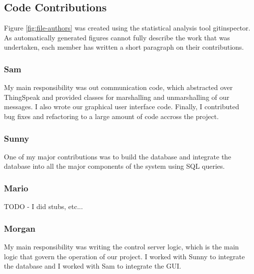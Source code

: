
\subsection{Code Contributions}

Figure \ref{fig:file-authors} was created using the statistical analysis tool
gitinspector. As automatically generated figures cannot fully describe the work
that was undertaken, each member has written a short paragraph on their
contributions.

\subsubsection{Sam}
My main responsibility was out communication code, which abstracted over
ThingSpeak and provided classes for marshalling and unmarshalling of our
messages. I also wrote our graphical user interface code. Finally, I
contributed bug fixes and refactoring to a large amount of code accross the
project.

\subsubsection{Sunny}
One of my major contributions was to build the
database and integrate the database into all
the major components of the system using SQL queries.
\subsubsection{Mario}
TODO
- I did stubs, etc...
\subsubsection{Morgan}
My main responsibility was writing the control server logic, which is the main
logic that govern the operation of our project. I worked with Sunny to
integrate the database and I worked with Sam to integrate the GUI.


